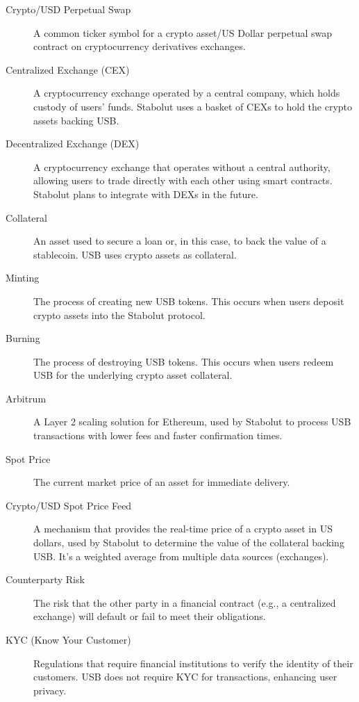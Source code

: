 \documentclass[11pt, a4paper]{article} %
\begin{document}
\begin{description}
\item[Crypto/USD Perpetual Swap] A common ticker symbol for a crypto asset/US Dollar perpetual swap contract on cryptocurrency derivatives exchanges.

\item[Centralized Exchange (CEX)] A cryptocurrency exchange operated by a central company, which holds custody of users' funds.  Stabolut uses a basket of CEXs to hold the crypto assets backing USB.

\item[Decentralized Exchange (DEX)] A cryptocurrency exchange that operates without a central authority, allowing users to trade directly with each other using smart contracts.  Stabolut plans to integrate with DEXs in the future.

\item[Collateral] An asset used to secure a loan or, in this case, to back the value of a stablecoin.  USB uses crypto assets as collateral.

\item[Minting] The process of creating new USB tokens.  This occurs when users deposit crypto assets into the Stabolut protocol.

\item[Burning] The process of destroying USB tokens.  This occurs when users redeem USB for the underlying crypto asset collateral.

\item[Arbitrum] A Layer 2 scaling solution for Ethereum, used by Stabolut to process USB transactions with lower fees and faster confirmation times.

\item[Spot Price] The current market price of an asset for immediate delivery.

\item[Crypto/USD Spot Price Feed] A mechanism that provides the real-time price of a crypto asset in US dollars, used by Stabolut to determine the value of the collateral backing USB. It's a weighted average from multiple data sources (exchanges).

\item[Counterparty Risk] The risk that the other party in a financial contract (e.g., a centralized exchange) will default or fail to meet their obligations.

\item[KYC (Know Your Customer)] Regulations that require financial institutions to verify the identity of their customers. USB does not require KYC for transactions, enhancing user privacy.


\end{description}
\end{document}
